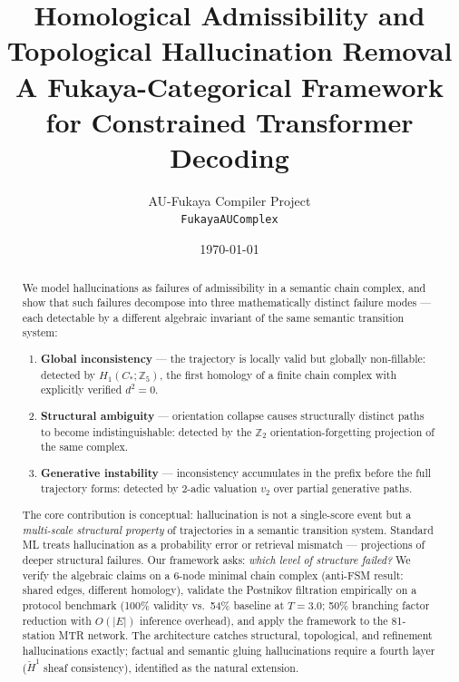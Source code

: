 \documentclass[11pt,a4paper]{article}
\title{%
  \textbf{Homological Admissibility and Topological Hallucination Removal}\\[6pt]
  \large A Fukaya-Categorical Framework for Constrained Transformer Decoding
}
\author{
  AU-Fukaya Compiler Project\\
  \texttt{FukayaAUComplex}
}
\date{\today}
\begin{document}
\maketitle

\begin{abstract}
We model hallucinations as failures of admissibility in a semantic chain
complex, and show that such failures decompose into three mathematically
distinct failure modes --- each detectable by a different algebraic
invariant of the same semantic transition system:
\begin{enumerate}[label=(\roman*),noitemsep]
  \item \textbf{Global inconsistency} ---
        the trajectory is locally valid but globally non-fillable:
        detected by $H_1(C_*;\mathbb{Z}_5)$, the first homology of a
        finite chain complex with explicitly verified $d^2=0$.
  \item \textbf{Structural ambiguity} ---
        orientation collapse causes structurally distinct paths to
        become indistinguishable: detected by the $\mathbb{Z}_2$
        orientation-forgetting projection of the same complex.
  \item \textbf{Generative instability} ---
        inconsistency accumulates in the prefix before the full
        trajectory forms: detected by 2-adic valuation $v_2$ over
        partial generative paths.
\end{enumerate}
The core contribution is conceptual:
hallucination is not a single-score event but a
\emph{multi-scale structural property} of trajectories in a semantic
transition system.
Standard ML treats hallucination as a probability error or retrieval
mismatch --- projections of deeper structural failures.
Our framework asks: \emph{which level of structure failed?}
We verify the algebraic claims on a 6-node minimal chain complex
(anti-FSM result: shared edges, different homology), validate the
Postnikov filtration empirically on a protocol benchmark
(100\% validity vs.\ 54\% baseline at $T=3.0$; 50\% branching
factor reduction with $O(|E|)$ inference overhead), and apply the
framework to the 81-station MTR network.
The architecture catches structural, topological, and refinement
hallucinations exactly; factual and semantic gluing hallucinations
require a fourth layer ($\check{H}^1$ sheaf consistency), identified
as the natural extension.
\end{abstract}

\tableofcontents
\newpage

\end{document}

